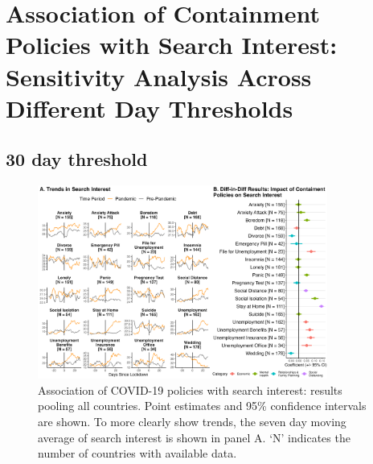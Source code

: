 \documentclass{article}
\begin{document}
\newpage
\section{Association of Containment Policies with Search Interest: Sensitivity Analysis Across Different Day Thresholds}
\label{si:lockdown_impact_diffdays}

\subsection{30 day threshold}

\begin{figure}[H]
    \centering
    \includegraphics[width=0.85\textwidth]{figures/did_overall_30.png}
    \caption{Association of COVID-19 policies with search interest: results pooling all countries. Point estimates and 95\% confidence intervals are shown. To more clearly show trends, the seven day moving average of search interest is shown in panel A. `N' indicates the number of countries with available data.}
    \label{fig:lockdown_impact_30}
\end{figure}
\end{document}
